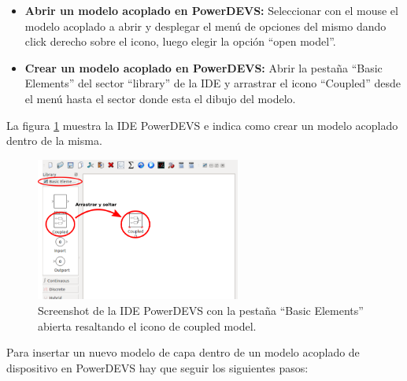 \documentclass[10pt,a4paper]{article}
\begin{document}
\begin{itemize}
\item \textbf{Abrir un modelo acoplado en PowerDEVS:} Seleccionar con el mouse el modelo acoplado a abrir y desplegar el menú de opciones del mismo dando click derecho sobre el icono, luego elegir la opción ``open model''.
\item \textbf{Crear un modelo acoplado en PowerDEVS: } Abrir la pestaña ``Basic Elements'' del sector ``library'' de la IDE y arrastrar el icono ``Coupled'' desde el menú hasta el sector donde esta el dibujo del modelo.
\end{itemize}

La figura \ref{figure: PowerDEVS IDE} muestra la IDE PowerDEVS e indica como crear un modelo acoplado dentro de la misma. \\

\begin{figure}[htbp]
    \centering
    \includegraphics[width = 0.6\textwidth]{img/png/powerDEVS_coupled.png}
    \caption{Screenshot de la IDE PowerDEVS con la pestaña ``Basic Elements'' abierta resaltando el icono de coupled model.}
    \label{figure: PowerDEVS IDE}
\end{figure}

Para insertar un nuevo modelo de capa dentro de un modelo acoplado de dispositivo en PowerDEVS hay que seguir los siguientes pasos:
\end{document}
